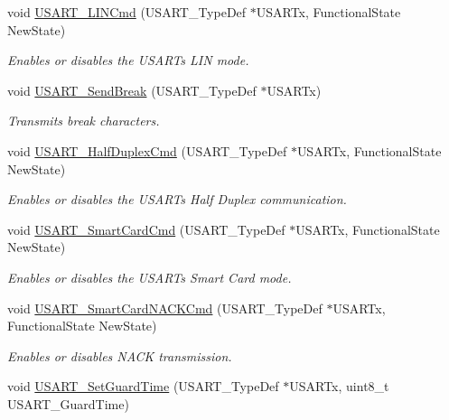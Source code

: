 \begin{DoxyCompactItemize}
void \mbox{\hyperlink{group___u_s_a_r_t_ga9fdd6296f4ca4acdfcbd58bf56bd4185}{U\+S\+A\+R\+T\+\_\+\+L\+I\+N\+Cmd}} (U\+S\+A\+R\+T\+\_\+\+Type\+Def $\ast$U\+S\+A\+R\+Tx, Functional\+State New\+State)
\begin{DoxyCompactList}\small\item\em Enables or disables the U\+S\+A\+RT\textquotesingle{}s L\+IN mode. \end{DoxyCompactList}\item 
void \mbox{\hyperlink{group___u_s_a_r_t_ga39a3d33e23ee28529fa8f7259ce6811e}{U\+S\+A\+R\+T\+\_\+\+Send\+Break}} (U\+S\+A\+R\+T\+\_\+\+Type\+Def $\ast$U\+S\+A\+R\+Tx)
\begin{DoxyCompactList}\small\item\em Transmits break characters. \end{DoxyCompactList}\item 
void \mbox{\hyperlink{group___u_s_a_r_t_gaaa23b05fe0e1896bad90da7f82750831}{U\+S\+A\+R\+T\+\_\+\+Half\+Duplex\+Cmd}} (U\+S\+A\+R\+T\+\_\+\+Type\+Def $\ast$U\+S\+A\+R\+Tx, Functional\+State New\+State)
\begin{DoxyCompactList}\small\item\em Enables or disables the U\+S\+A\+RT\textquotesingle{}s Half Duplex communication. \end{DoxyCompactList}\item 
void \mbox{\hyperlink{group___u_s_a_r_t_gabd1347e244c623447151ba3a5e986c5f}{U\+S\+A\+R\+T\+\_\+\+Smart\+Card\+Cmd}} (U\+S\+A\+R\+T\+\_\+\+Type\+Def $\ast$U\+S\+A\+R\+Tx, Functional\+State New\+State)
\begin{DoxyCompactList}\small\item\em Enables or disables the U\+S\+A\+RT\textquotesingle{}s Smart Card mode. \end{DoxyCompactList}\item 
void \mbox{\hyperlink{group___u_s_a_r_t_ga62e22f47e38aa53f2edce8771f7a5dfa}{U\+S\+A\+R\+T\+\_\+\+Smart\+Card\+N\+A\+C\+K\+Cmd}} (U\+S\+A\+R\+T\+\_\+\+Type\+Def $\ast$U\+S\+A\+R\+Tx, Functional\+State New\+State)
\begin{DoxyCompactList}\small\item\em Enables or disables N\+A\+CK transmission. \end{DoxyCompactList}\item 
void \mbox{\hyperlink{group___u_s_a_r_t_gac4a35c6acd71ae7e0d67c1f03f0a8777}{U\+S\+A\+R\+T\+\_\+\+Set\+Guard\+Time}} (U\+S\+A\+R\+T\+\_\+\+Type\+Def $\ast$U\+S\+A\+R\+Tx, uint8\+\_\+t U\+S\+A\+R\+T\+\_\+\+Guard\+Time)

\end{DoxyCompactItemize}
